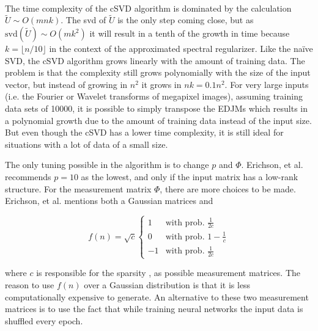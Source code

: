 $ $ \newline


The time complexity of the cSVD algorithm is dominated by the calculation $\tilde U \sim O(mnk)$. The svd of $\tilde U$ is the only step coming close, but as $\mathrm{svd}(\tilde U) \sim O(mk^2)$ it will result in a tenth of the growth in time because $k = \lfloor n/10 \rfloor$ in the context of the approximated spectral regularizer. Like the naïve SVD, the cSVD algorithm grows linearly with the amount of training data. The problem is that the complexity still grows polynomially with the size of the input vector, but instead of growing in $n^2$ it grows in $nk = 0.1n^2$. For very large inputs (i.e. the Fourier or Wavelet transforms of megapixel images), assuming training data sets of 10000, it is possible to simply transpose the EDJMs which results in a polynomial growth due to the amount of training data instead of the input size. But even though the cSVD has a lower time complexity, it is still ideal for situations with a lot of data of a small size.

The only tuning possible in the algorithm is to change $p$ and $\Phi$. Erichson, et al. recommends $p=10$ as the lowest, and only if the input matrix has a low-rank structure. For the measurement matrix $\Phi$, there are more choices to be made. Erichson, et al. mentions both a Gaussian matrices and 

\begin{equation*}
    f(n) = \sqrt{c}
    \begin{cases}
       1 &\mbox{with prob. } \frac{1}{2c} \\
       0 &\mbox{with prob. } 1 - \frac{1}{c} \\
       -1 &\mbox{with prob. } \frac{1}{2c}
    \end{cases}
\end{equation*}

where $c$ is responsible for the sparsity , as possible measurement matrices. The reason to use $f(n)$ over a Gaussian distribution is that it is less computationally expensive to generate. An alternative to these two measurement matrices is to use the fact that while training neural networks the input data is shuffled every epoch. 

